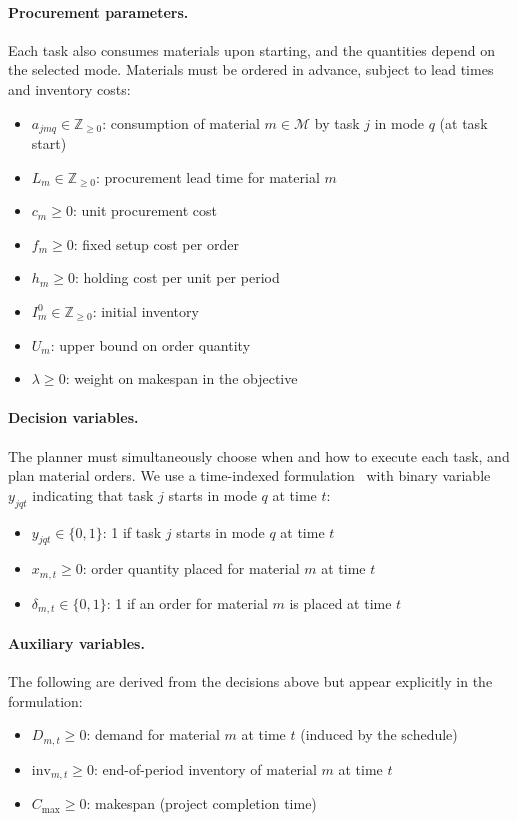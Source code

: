 \documentclass[11pt]{article}
\newcommand{\calM}{\mathcal{M}}
\begin{document}
\paragraph{Procurement parameters.}
Each task also consumes materials upon starting, and the quantities depend on the selected mode.
Materials must be ordered in advance, subject to lead times and inventory costs:
\begin{itemize}
    \item $a_{jmq} \in \mathbb{Z}_{\geq 0}$: consumption of material $m \in \calM$ by task $j$ in mode $q$ (at task start)
    \item $L_m \in \mathbb{Z}_{\geq 0}$: procurement lead time for material $m$
    \item $c_m \geq 0$: unit procurement cost
    \item $f_m \geq 0$: fixed setup cost per order
    \item $h_m \geq 0$: holding cost per unit per period
    \item $I_m^0 \in \mathbb{Z}_{\geq 0}$: initial inventory
    \item $U_m$: upper bound on order quantity
    \item $\lambda \geq 0$: weight on makespan in the objective
\end{itemize}

\paragraph{Decision variables.}
The planner must simultaneously choose when and how to execute each task, and plan material orders.
We use a time-indexed formulation~\citep{kone2011milp} with binary variable $y_{jqt}$ indicating that task $j$ starts in mode $q$ at time $t$:
\begin{itemize}
    \item $y_{jqt} \in \{0, 1\}$: 1 if task $j$ starts in mode $q$ at time $t$
    \item $x_{m,t} \geq 0$: order quantity placed for material $m$ at time $t$
    \item $\delta_{m,t} \in \{0, 1\}$: 1 if an order for material $m$ is placed at time $t$
\end{itemize}

\paragraph{Auxiliary variables.}
The following are derived from the decisions above but appear explicitly in the formulation:
\begin{itemize}
    \item $D_{m,t} \geq 0$: demand for material $m$ at time $t$ (induced by the schedule)
    \item $\mathrm{inv}_{m,t} \geq 0$: end-of-period inventory of material $m$ at time $t$
    \item $C_{\max} \geq 0$: makespan (project completion time)
\end{itemize}
\end{document}
